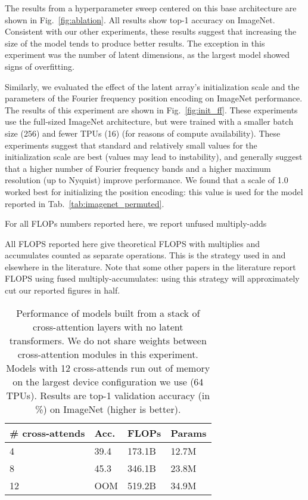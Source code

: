 \documentclass{article}
\begin{document}
The results from a hyperparameter sweep centered on this base architecture are shown in Fig.~\ref{fig:ablation}. All results show top-1 accuracy on ImageNet. Consistent with our other experiments, these results suggest that increasing the size of the model tends to produce better results. The exception in this experiment was the number of latent dimensions, as the largest model showed signs of overfitting.

Similarly, we evaluated the effect of the latent array's initialization scale and the parameters of the Fourier frequency position encoding on ImageNet performance. The results of this experiment are shown in Fig.~\ref{fig:init_ff}. These experiments use the full-sized ImageNet architecture, but were trained with a smaller batch size (256) and fewer TPUs (16) (for reasons of compute availability). These experiments suggest that standard and relatively small values for the initialization scale are best (values  may lead to instability), and generally suggest that a higher number of Fourier frequency bands and a higher maximum resolution (up to Nyquist) improve performance. We found that a scale of 1.0 worked best for initializing the position encoding: this value is used for the model reported in Tab.~\ref{tab:imagenet_permuted}.

For all FLOPs numbers reported here, we report unfused multiply-adds

All FLOPS reported here give theoretical FLOPS with multiplies and accumulates counted as separate operations. This is the strategy used in \cite{kaplan2020scaling} and elsewhere in the literature. Note that some other papers in the literature report FLOPS using fused multiply-accumulates: using this strategy will approximately cut our reported figures in half.

\begin{table}[t]
\centering
\begin{tabular}{|l|l|l|l|}
\hline
\# cross-attends        & Acc. & FLOPs   & Params \\ \hline
4                       & 39.4 & 173.1B  & 12.7M   \\ 
8                       & 45.3 & 346.1B  & 23.8M   \\
12                      & OOM  & 519.2B  & 34.9M   \\ \hline
\end{tabular}
\vspace{-8pt}
\caption{Performance of models built from a stack of cross-attention layers with no latent transformers. We do not share weights between cross-attention modules in this experiment. Models with 12 cross-attends run out of memory on the largest device configuration we use (64 TPUs). Results are top-1 validation accuracy (in \%) on ImageNet (higher is better).}
\label{tab:no_transformers}
\end{table}
\end{document}
